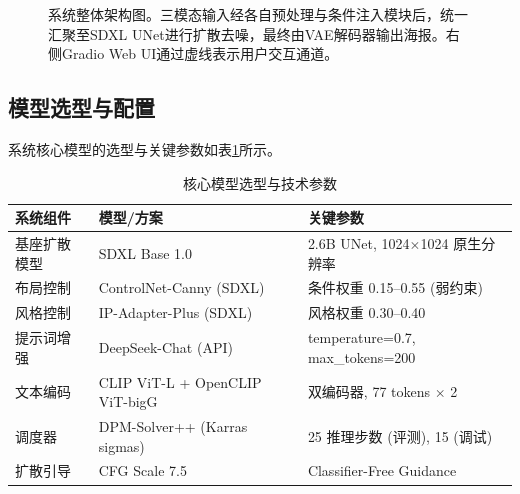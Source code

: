 \documentclass[12pt,a4paper]{ctexart}
\begin{document}
\begin{figure}[H]
{%
}
\caption{系统整体架构图。三模态输入经各自预处理与条件注入模块后，统一汇聚至SDXL UNet进行扩散去噪，最终由VAE解码器输出海报。右侧Gradio Web UI通过虚线表示用户交互通道。}
\label{fig:architecture}
\end{figure}

\subsection{模型选型与配置}

系统核心模型的选型与关键参数如表\ref{tab:models}所示。

\begin{table}[H]
\centering
\caption{核心模型选型与技术参数}
\label{tab:models}
\begin{tabular}{@{}lll@{}}
\toprule
\rowcolor{tabhead}
\color{white}\textbf{系统组件} & \color{white}\textbf{模型/方案} & \color{white}\textbf{关键参数} \\
\midrule
基座扩散模型 & SDXL Base 1.0 & 2.6B UNet, 1024$\times$1024 原生分辨率 \\
布局控制 & ControlNet-Canny (SDXL) & 条件权重 0.15--0.55 (弱约束) \\
风格控制 & IP-Adapter-Plus (SDXL)  & 风格权重 0.30--0.40 \\
提示词增强 & DeepSeek-Chat (API)      & temperature=0.7, max\_tokens=200 \\
文本编码 & CLIP ViT-L + OpenCLIP ViT-bigG & 双编码器, 77 tokens $\times$ 2 \\
调度器   & DPM-Solver++ (Karras sigmas) & 25 推理步数 (评测), 15 (调试) \\
扩散引导 & CFG Scale 7.5              & Classifier-Free Guidance \\
\bottomrule
\end{tabular}
\end{table}
\end{document}

